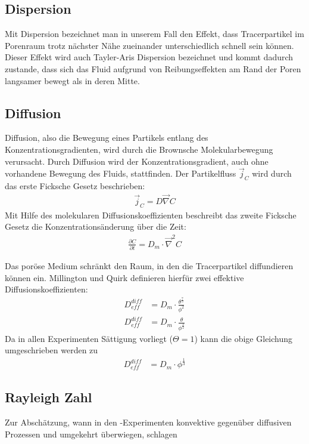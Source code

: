 \subsection{Dispersion}
\label{sec:disp}
Mit Dispersion bezeichnet man in unserem Fall den Effekt, dass Tracerpartikel im Porenraum trotz nächster Nähe zueinander unterschiedlich schnell sein können. Dieser Effekt wird auch Tayler-Aris Dispersion bezeichnet und kommt dadurch zustande, dass sich das Fluid aufgrund von Reibungseffekten am Rand der Poren langsamer bewegt als in deren Mitte.

\subsection{Diffusion}
\label{sec:diff}
Diffusion, also die Bewegung eines Partikels entlang des Konzentrationsgradienten, wird durch die Brownsche Molekularbewegung verursacht. Durch Diffusion wird der Konzentrationsgradient, auch ohne vorhandene Bewegung des Fluids, stattfinden. Der Partikelfluss $\vec{j}_C$ wird durch das erste Ficksche Gesetz beschrieben:
\begin{align}
 \vec{j}_C = D \vec{\nabla} C
\end{align}
Mit Hilfe des molekularen Diffusionskoeffizienten beschreibt das zweite Ficksche Gesetz die Konzentrationsänderung über die Zeit:
\begin{align}
 \frac{\partial C}{\partial t} = D_m \cdot \vec{\nabla}^2 C
\end{align}

Das poröse Medium schränkt den Raum, in den die Tracerpartikel diffundieren können ein. Millington und Quirk \citeyearpar{milli-quir} definieren hierfür zwei effektive Diffusionskoeffizienten:
\begin{align}
 D_{eff}^{diff} &= D_m \cdot \frac{\theta^{\frac{7}{3}}}{\phi^2} \\
 D_{eff}^{diff} &= D_m \cdot \frac{\theta}{              \phi^\frac{3}{2}}
\end{align}
Da in allen Experimenten Sättigung vorliegt ($\Theta = 1$) kann die obige Gleichung umgeschrieben werden zu
\begin{align}
 D_{eff}^{diff} &= D_m \cdot \phi^{\frac{1}{3}}
\end{align}

\subsection{Rayleigh Zahl}
\label{sec:ray}
Zur Abschätzung, wann in den \HSC-Experimenten konvektive gegenüber diffusiven Prozessen und umgekehrt überwiegen, schlagen \citeauthor*{fernandez}

